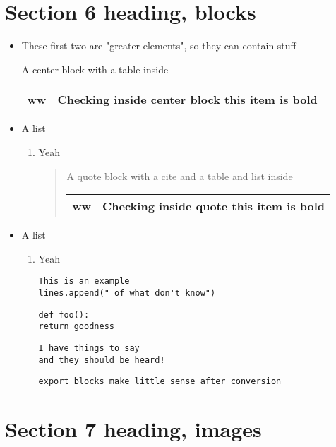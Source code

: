 \documentclass[11pt]{article}
\begin{document}
\section{Section 6 heading, blocks  }
 \label{obj-317}
 \label{obj-316}
\begin{itemize}
\item
These first two are "greater elements", so they can contain stuff
\begin{center}
A center block with a table inside

\begin{tabular}{|c|c|}
\hline
 ww  & Checking inside center block \textbf{this item is bold} \\
\hline
\end{tabular}
\end{center}
\item
A list
\begin{enumerate}
\item
Yeah

\begin{quote}
A quote block with a cite and  a table and list inside

\begin{tabular}{|c|c|}
\hline
 ww  & Checking inside quote \textbf{this item is bold} \\
\hline
\end{tabular}
\end{quote}
\end{enumerate}
\item
A list
\begin{enumerate}
\item
Yeah

\begin{verbatim}
This is an example
lines.append(" of what don't know")
\end{verbatim}
\begin{verbatim}
def foo():
return goodness
\end{verbatim}
\begin{verbatim}
I have things to say
and they should be heard!
\end{verbatim}
\begin{verbatim}
export blocks make little sense after conversion 
\end{verbatim}
\vspace{\baselineskip}
\end{enumerate}
\end{itemize}
\section{Section 7 heading, images  }
 \label{obj-360}
 \label{obj-359}
\end{document}

